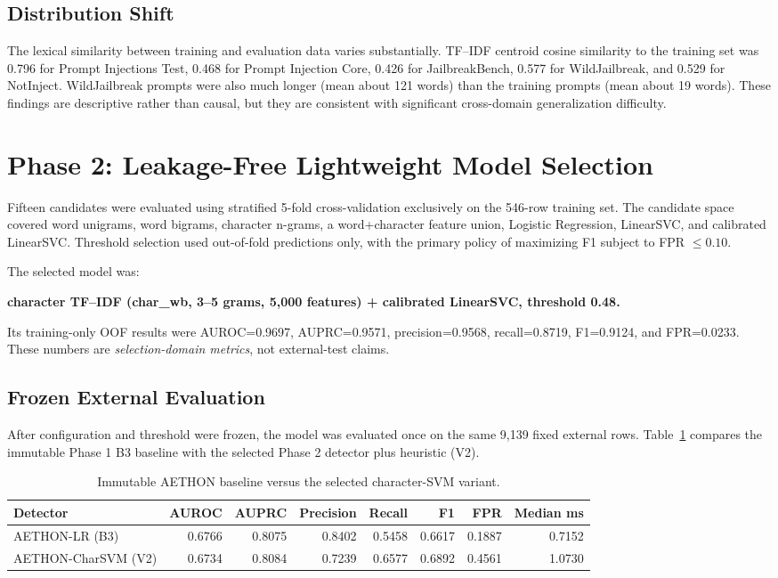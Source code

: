 \documentclass[11pt,a4paper]{article}
\begin{document}
\subsection{Distribution Shift}
The lexical similarity between training and evaluation data varies substantially. TF--IDF centroid cosine similarity to the training set was 0.796 for Prompt Injections Test, 0.468 for Prompt Injection Core, 0.426 for JailbreakBench, 0.577 for WildJailbreak, and 0.529 for NotInject. WildJailbreak prompts were also much longer (mean about 121 words) than the training prompts (mean about 19 words). These findings are descriptive rather than causal, but they are consistent with significant cross-domain generalization difficulty.

\section{Phase 2: Leakage-Free Lightweight Model Selection}
Fifteen candidates were evaluated using stratified 5-fold cross-validation exclusively on the 546-row training set. The candidate space covered word unigrams, word bigrams, character n-grams, a word+character feature union, Logistic Regression, LinearSVC, and calibrated LinearSVC. Threshold selection used out-of-fold predictions only, with the primary policy of maximizing F1 subject to FPR $\leq 0.10$.

The selected model was:

\begin{center}
\textbf{character TF--IDF (char\_wb, 3--5 grams, 5,000 features) + calibrated LinearSVC, threshold 0.48.}
\end{center}

Its training-only OOF results were AUROC=0.9697, AUPRC=0.9571, precision=0.9568, recall=0.8719, F1=0.9124, and FPR=0.0233. These numbers are \emph{selection-domain metrics}, not external-test claims.

\subsection{Frozen External Evaluation}
After configuration and threshold were frozen, the model was evaluated once on the same 9,139 fixed external rows. Table~\ref{tab:phase2} compares the immutable Phase 1 B3 baseline with the selected Phase 2 detector plus heuristic (V2).

\begin{table}[H]
\centering
\caption{Immutable AETHON baseline versus the selected character-SVM variant.}
\label{tab:phase2}
\begin{tabular}{lrrrrrrr}
\toprule
Detector & AUROC & AUPRC & Precision & Recall & F1 & FPR & Median ms \\
\midrule
AETHON-LR (B3) & 0.6766 & 0.8075 & 0.8402 & 0.5458 & 0.6617 & 0.1887 & 0.7152 \\
AETHON-CharSVM (V2) & 0.6734 & 0.8084 & 0.7239 & 0.6577 & 0.6892 & 0.4561 & 1.0730 \\
\bottomrule
\end{tabular}
\end{table}
\end{document}
